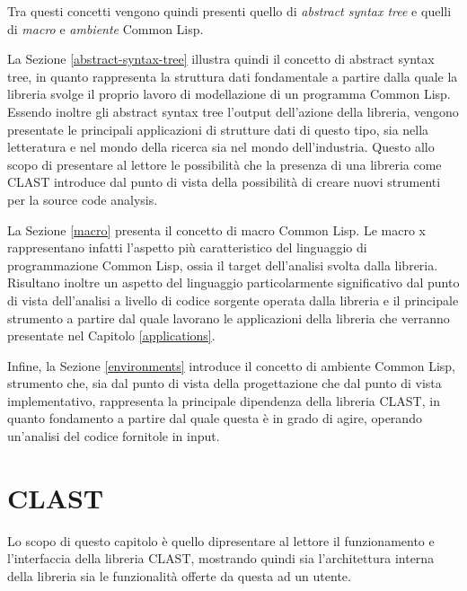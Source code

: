\documentclass{book}
\begin{document}
Tra questi concetti vengono quindi presenti quello di
\textit{abstract syntax tree} e quelli di \textit{macro} e \textit{ambiente}
Common Lisp.

La Sezione \ref{abstract-syntax-tree} illustra quindi il concetto di abstract
syntax tree, in quanto rappresenta la struttura dati fondamentale a partire
dalla quale la libreria svolge il proprio lavoro di modellazione di un programma
Common Lisp. Essendo inoltre gli abstract syntax tree l'output dell'azione della
libreria, vengono presentate le principali applicazioni di strutture dati di
questo tipo, sia nella letteratura e nel mondo della ricerca sia nel mondo
dell'industria. Questo allo scopo di presentare al lettore le possibilità che la
presenza di una libreria come CLAST introduce dal punto di vista della
possibilità di creare nuovi strumenti per la source code analysis.

La Sezione \ref{macro} presenta il concetto di macro Common Lisp. Le macro x
rappresentano infatti l'aspetto più caratteristico del linguaggio di
programmazione Common Lisp, ossia il target dell'analisi svolta dalla libreria.
Risultano inoltre un aspetto del linguaggio particolarmente significativo dal
punto di vista dell'analisi a livello di codice sorgente operata dalla libreria
e il principale strumento a partire dal quale lavorano le applicazioni della
libreria che verranno presentate nel Capitolo \ref{applications}.

Infine, la Sezione \ref{environments} introduce il concetto di ambiente Common
Lisp, strumento che, sia dal punto di vista della progettazione che dal punto di
vista implementativo, rappresenta la principale dipendenza della libreria CLAST,
in quanto fondamento a partire dal quale questa è in grado di agire, operando
un'analisi del codice fornitole in input.






\endgroup

\begingroup
\let\clearpage\relax

\chapter{CLAST}
\label{library}

Lo scopo di questo capitolo è quello dipresentare al lettore il funzionamento e
l'interfaccia della libreria CLAST, mostrando quindi sia l'architettura interna
della libreria sia le funzionalità offerte da questa ad un utente.
\end{document}
